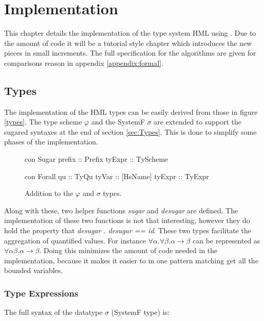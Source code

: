 \chapter{Implementation}
\label{Implementation}
This chapter details the implementation of the type system HML using \rcore. Due to the amount of code it will be a tutorial style chapter which introduces the new pieces in small increments. The full specification for the algorithms are given for comparisons reason in appendix \ref{appendix:formal}.
\section{Types}
The implementation of the HML types can be easily derived from those in figure \ref{types}. The type scheme $\varphi$ and the SystemF $\sigma$ are extended to support the sugared syntaxes at the end of section \ref{sec:Types}. This is done to simplify some phases of the implementation.

\begin{figure}[H]
\begin{minipage}[t]{0.4\linewidth}
\begin{code}
  con Sugar
     prefix  :: Prefix
     tyExpr  :: TyScheme
\end{code}
\end{minipage}
\begin{minipage}[t]{0.6\linewidth}
\begin{code}
  con Forall
    qu        :: TyQu
    tyVar     :: [HsName]
    tyExpr    :: TyExpr 
\end{code} 
\end{minipage}
\caption{Addition to the $\varphi$ and $\sigma$ types.}
\label{abs:fig:types}
\end{figure}

Along with these, two helper functions \emph{sugar} and \emph{desugar} are defined. The implementation of these two functions is not that interesting, however they do hold the property that \emph{desugar . desugar == id}. These two types facilitate the aggregation of quantified values. For instance $\forall \alpha . \forall \beta. \alpha \rightarrow \beta$ can be represented as $\forall \alpha \beta . \alpha \rightarrow \beta$. Doing this minimizes the amount of code needed in the implementation, because it makes it easier to in one pattern matching get all the bounded variables.
\subsection{Type Expressions}
The full syntax of the datatype $\sigma$ (SystemF type) is:

